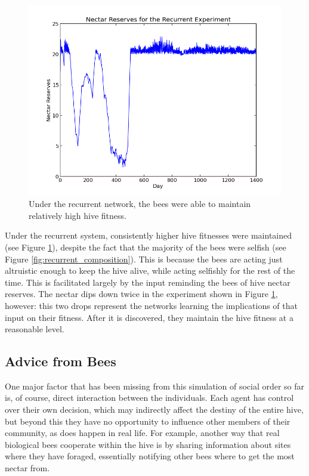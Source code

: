 \documentclass[twoside]{article}
\begin{document}
\begin{multicols}{2}
			\begin{figure}[H]
				\begin{center}
					\includegraphics[width=.5\textwidth]{results/recurrent_res.png}
				\end{center}
				\caption{Under the recurrent network, the bees were able to maintain relatively high hive fitness.}
				\label{fig:recurrent_reserves}
			\end{figure}

			Under the recurrent system, consistently higher hive fitnesses were maintained (see Figure \ref{fig:recurrent_reserves}), despite the fact that the majority of the bees were selfish (see Figure \ref{fig:recurrent_composition}). This is because the bees are acting just altruistic enough to keep the hive alive, while acting selfishly for the rest of the time. This is facilitated largely by the input reminding the bees of hive nectar reserves. The nectar dips down twice in the experiment shown in Figure \ref{fig:recurrent_reserves}, however: this two drops represent the networks learning the implications of that input on their fitness. After it is discovered, they maintain the hive fitness at a reasonable level.

		\subsection{Advice from Bees} %
		\label{sub:advice_from_bees}

			One major factor that has been missing from this simulation of social order so far is, of course, direct interaction between the individuals. Each agent has control over their own decision, which may indirectly affect the destiny of the entire hive, but beyond this they have no opportunity to influence other members of their community, as does happen in real life. For example, another way that real biological bees cooperate within the hive is by sharing information about sites where they have foraged, essentially notifying other bees where to get the most nectar from. 


\end{multicols}
\end{document}
